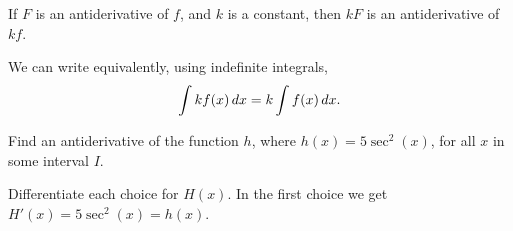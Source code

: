 \documentclass{ximera}
\begin{document}

\begin{theorem}\label{theorem:CMRA}
If $F$ is an antiderivative of $f$, and $k$ is a constant, then $kF$
is an antiderivative of $kf$.

We can write equivalently, using indefinite integrals, 
\[\int kf(x) \mathop{}\!d x= k\int f(x)\mathop{}\!d x.\]
\end{theorem}

\begin{example}
  Find  an antiderivative of the function $h$, where
   $h(x)=5\sec^{2}(x)$,  for all $x$ in some interval $I$.
  \begin{multipleChoice}
  \end{multipleChoice}
  \begin{feedback}
    Differentiate each choice for $H(x)$. In the first choice we get
    $H'(x)=5\sec^{2}(x)=h(x)$.
  \end{feedback}
\end{example}

%
%
%  



%
%
%
\end{document}
